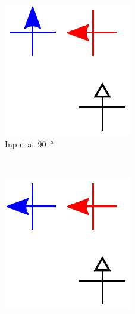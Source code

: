 \documentclass[11pt,a4paper,english]{article}
\newcommand{\rulesep}{\unskip\ \vrule\ }
\begin{document}
\begin{figure}
\begin{subfigure}[t]{0.23\textwidth}
    \includegraphics[width=\textwidth]{Figures/half_adder/schematic/000006_inputs_In1_0213/Input 90 deg.pdf}
    \caption{Input at \SI{90}{\degree}}
\end{subfigure}
\rulesep
\begin{subfigure}[t]{0.23\textwidth}
    \includegraphics[width=\textwidth]{Figures/half_adder/schematic/000006_inputs_In1_0213/Input 180 deg.pdf}

\end{subfigure}
\end{figure}
\end{document}
